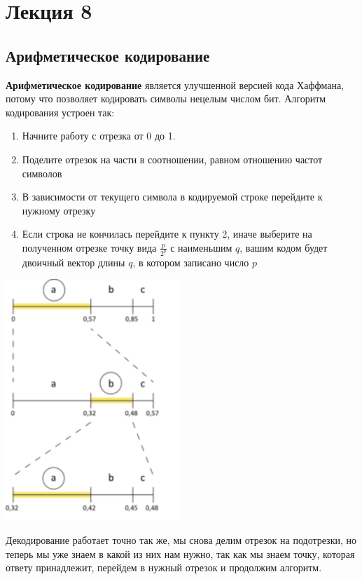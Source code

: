 \documentclass{article}
\begin{document}
\section{Лекция 8}
\subsection{Арифметическое кодирование}
\textbf{Арифметическое кодирование} является улучшенной версией кода Хаффмана, потому что позволяет кодировать символы нецелым числом бит. Алгоритм кодирования устроен так:
\begin{enumerate}
    \item Начните работу с отрезка от 0 до 1.
    \item Поделите отрезок на части в соотношении, равном отношению частот символов
    \item В зависимости от текущего символа в кодируемой строке перейдите к нужному отрезку
    \item Если строка не кончилась перейдите к пункту 2, иначе выберите на полученном отрезке точку вида $\frac{p}{2^q}$ с наименьшим $q$, вашим кодом будет двоичный вектор длины $q$, в котором записано число $p$
\end{enumerate}
\begin{center}
  \includegraphics[height=9.1cm]{arif1.png}
\end{center}
Декодирование работает точно так же, мы снова делим отрезок на подотрезки, но теперь мы уже знаем в какой из них нам нужно, так как мы знаем точку, которая ответу принадлежит, перейдем в нужный отрезок и продолжим алгоритм.
\end{document}

